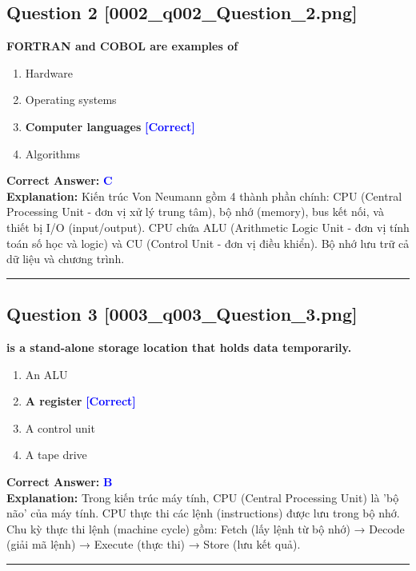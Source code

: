 \documentclass[11pt,a4paper]{article}
\begin{document}
\begin{minipage}{\textwidth}
\subsection*{Question 2 \quad \footnotesize{[0002\_q002\_Question\_2.png]}}
\noindent \textbf{FORTRAN and COBOL are examples of}

\begin{enumerate}[label=\Alph*.]
    \item Hardware
    \item Operating systems
    \item \textbf{Computer languages} \hfill \textcolor{blue}{\textbf{[Correct]}}
    \item Algorithms
\end{enumerate}

\noindent \textbf{Correct Answer:} \textcolor{blue}{\textbf{C}} \\[2pt]
\noindent \textbf{Explanation:} Kiến trúc Von Neumann gồm 4 thành phần chính: CPU (Central Processing Unit - đơn vị xử lý trung tâm), bộ nhớ (memory), bus kết nối, và thiết bị I/O (input/output). CPU chứa ALU (Arithmetic Logic Unit - đơn vị tính toán số học và logic) và CU (Control Unit - đơn vị điều khiển). Bộ nhớ lưu trữ cả dữ liệu và chương trình.

\par\vspace{0.3cm}
\hrule
\vspace{0.3cm}
\end{minipage}

\begin{minipage}{\textwidth}
\subsection*{Question 3 \quad \footnotesize{[0003\_q003\_Question\_3.png]}}
\noindent \textbf{is a stand-alone storage location that holds data temporarily.}

\begin{enumerate}[label=\Alph*.]
    \item An ALU
    \item \textbf{A register} \hfill \textcolor{blue}{\textbf{[Correct]}}
    \item A control unit
    \item A tape drive
\end{enumerate}

\noindent \textbf{Correct Answer:} \textcolor{blue}{\textbf{B}} \\[2pt]
\noindent \textbf{Explanation:} Trong kiến trúc máy tính, CPU (Central Processing Unit) là 'bộ não' của máy tính. CPU thực thi các lệnh (instructions) được lưu trong bộ nhớ. Chu kỳ thực thi lệnh (machine cycle) gồm: Fetch (lấy lệnh từ bộ nhớ) → Decode (giải mã lệnh) → Execute (thực thi) → Store (lưu kết quả).

\par\vspace{0.3cm}
\hrule
\vspace{0.3cm}
\end{minipage}
\end{document}
